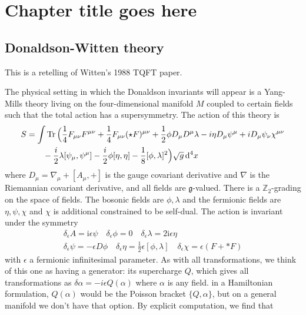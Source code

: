 
\chapter{Chapter title goes here}
\label{chapter2}

\section{Donaldson-Witten theory}
This is a retelling of Witten's 1988 TQFT paper. 

The physical setting in which the Donaldson invariants will appear is a
Yang-Mills theory living on the four-dimensional manifold $M$ coupled to certain
fields such that the total action has a supersymmetry. The action of this theory
is 
\begin{align*}
	S &= \int \Tr \Big(\frac{1}{4}F_{\mu\nu}F^{\mu\nu} +\frac{1}{4}F_{\mu\nu}(\star
F)^{\mu\nu} +\frac{1}{2}\phi D_\mu D^\mu\lambda - i\eta D_\mu\psi^\mu +
iD_\mu\psi_\nu\chi^{\mu\nu} \\ 
	  &\qquad - \frac{i}{2}\lambda[\psi_\mu,\psi^\mu]-\frac{i}{2}\phi[\eta,\eta]-\frac{1}{8}[\phi,\lambda]^2\Big)\sqrt{g} \odif[order=4]{x}
\end{align*}
where $D_\mu = \nabla_\mu + [A_\mu,+]$ is the gauge covariant derivative and
$\nabla$ is the Riemannian covariant derivative, and all fields are
$\mathfrak{g}$-valued. There is a  $\mathbb{Z}_2$-grading on the space of
fields. The bosonic fields are $\phi,\lambda$ and the fermionic fields are
$\eta,\psi,\chi$ and  $\chi$ is additional constrained to be self-dual. The
action is invariant under the symmetry 
\begin{align*}
	\delta_\epsilon A = \mathrm{i}\epsilon\psi \quad \delta_\epsilon\phi = 0
	\quad \delta_\epsilon\lambda = 2\mathrm{i}\epsilon\eta \\
	\delta_\epsilon\psi = -\epsilon D\phi \quad \delta_\epsilon\eta =
	\frac{1}{2}\epsilon[\phi,\lambda] \quad \delta_\epsilon \chi = \epsilon(F +
	\ast F) 
\end{align*}
with $\epsilon$ a fermionic infinitesimal parameter. As with all
transformations, we think of this one as having a generator: its supercharge
$Q$, which gives all transformations as  $\delta \alpha=-i\epsilon Q(\alpha)$
where $\alpha$ is any field. in a Hamiltonian formulation,  $Q(\alpha)$ would be
the Poisson bracket  $\{Q,\alpha\}$, but on a general manifold we don't have
that option. By explicit computation, we find that 

